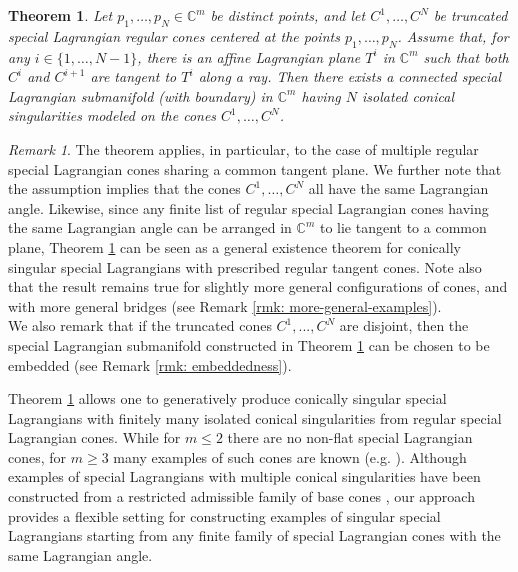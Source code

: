 \documentclass[11pt]{amsart}
\newtheorem{theorem}{Theorem}
\theoremstyle{definition}
\theoremstyle{remark}
\newtheorem{remark}{Remark}
\newcommand{\C}{\mathbb{C}}
\begin{document}
\begin{theorem}\label{thm: main-theorem}
    Let $p_1,\ldots,p_N\in \C^m$ be distinct points, and let $C^1,\ldots,C^N$ be truncated special Lagrangian regular cones centered at the points $p_1,\ldots,p_N$. Assume that, for any $i\in\{1,\ldots,N-1\}$, there is an affine Lagrangian plane $T^i$ in $\C^m$ such that both $C^i$ and $C^{i+1}$ are tangent to $T^i$ along a ray.
    Then there exists a connected special Lagrangian submanifold (with boundary) in $\C^m$ having $N$ isolated conical singularities modeled on the cones $C^1,\ldots,C^N$. 
\end{theorem}
\begin{remark}
The theorem applies, in particular, to the case of multiple regular special Lagrangian cones sharing a common tangent plane. We further note that the assumption implies that the cones $C^1,\ldots,C^N$ all have the same Lagrangian angle. Likewise, since any finite list of regular special Lagrangian cones having the same Lagrangian angle can be arranged in $\C^m$ to lie tangent to a common plane, Theorem \ref{thm: main-theorem} can be seen as a general existence theorem for conically singular special Lagrangians with prescribed regular tangent cones. Note also that the result remains true for slightly more general configurations of cones, and with more general bridges (see Remark \ref{rmk: more-general-examples}).\\
We also remark that if the truncated cones $C^1,..., C^N$ are disjoint, then the special Lagrangian submanifold constructed in Theorem \ref{thm: main-theorem} can be chosen to be embedded (see Remark \ref{rmk: embeddedness}).
\end{remark}

Theorem \ref{thm: main-theorem} allows one to generatively produce conically singular special Lagrangians with finitely many isolated conical singularities from regular special Lagrangian cones. While for $m\leq2$ there are no non-flat special Lagrangian cones, for $m\geq 3$ many examples of such cones are known (e.g. \cite{HL82, Haskins-SLag-cones, HK07, Haskins-Kapouleas-gluing, Oh07}). Although examples of special Lagrangians with multiple conical singularities have been constructed from a restricted admissible family of base cones \cite[Example 6.12]{Pacini-gluing}, our approach provides a flexible setting for constructing examples of singular special Lagrangians starting from any finite family of special Lagrangian cones with the same Lagrangian angle. 
\end{document}
